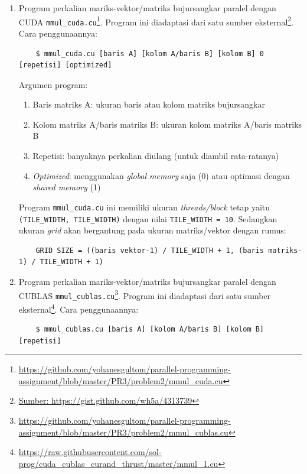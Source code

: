 \begin{enumerate}

	\item Program perkalian mariks-vektor/matriks bujursangkar paralel dengan CUDA \verb|mmul_cuda.cu|\footnote{\url{https://github.com/yohanesgultom/parallel-programming-assignment/blob/master/PR3/problem2/mmul_cuda.cu}}. Program ini diadaptasi dari satu sumber eksternal\footnote{\url{Sumber: https://gist.github.com/wh5a/4313739}}. Cara penggunaannya:
	
	\begin{lstlisting}
	$ mmul_cuda.cu [baris A] [kolom A/baris B] [kolom B] 0 [repetisi] [optimized]​
	\end{lstlisting}
	
	Argumen program:
	\begin{enumerate}
		\item Baris matriks A: ukuran baris atau kolom matriks bujursangkar
		\item Kolom matriks A/baris matriks B: ukuran kolom matriks A/baris matriks B
		\item Repetisi: banyaknya perkalian diulang (untuk diambil rata-ratanya)
		\item \textit{Optimized}: menggunakan \textit{global memory} saja (0) atau optimasi dengan \textit{shared memory} (1)
	\end{enumerate}
	
	Program \verb|mmul_cuda.cu| ini memiliki ukuran \textit{threads/block} tetap yaitu \verb|(TILE_WIDTH, TILE_WIDTH)| dengan nilai \verb|TILE_WIDTH = 10|. Sedangkan ukuran \textit{grid} akan bergantung pada ukuran matriks/vektor dengan rumus:
	
	\begin{lstlisting}
	GRID SIZE = ((baris vektor-1) / TILE_WIDTH + 1, (baris matriks-1) / TILE_WIDTH + 1)
	\end{lstlisting}
	
	\item Program perkalian mariks-vektor/matriks bujursangkar paralel dengan CUBLAS \verb|mmul_cublas.cu|\footnote{\url{https://github.com/yohanesgultom/parallel-programming-assignment/blob/master/PR3/problem2/mmul_cublas.cu}}. Program ini diadaptasi dari satu sumber eksternal\footnote{\url{https://raw.githubusercontent.com/sol-prog/cuda_cublas_curand_thrust/master/mmul_1.cu}}. Cara penggunaannya:
	
	\begin{lstlisting}
	$ mmul_cublas.cu [baris A] [kolom A/baris B] [kolom B] [repetisi]
	\end{lstlisting}
	

\end{enumerate}
